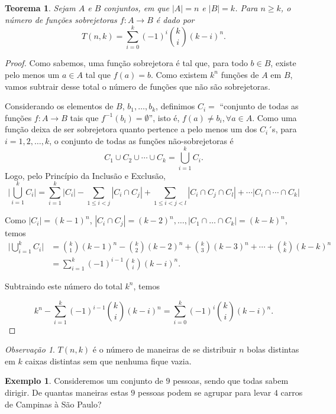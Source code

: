 \documentclass[]{book}
\newtheorem{theorem}{Teorema}[chapter]
\theoremstyle{definition}
\theoremstyle{definition}
\newtheorem{example}{Exemplo}[chapter]
\theoremstyle{definition}
\theoremstyle{remark}
\newtheorem*{remark}{Observação}
\begin{document}
\begin{theorem}
\protect\hypertarget{thm:teoFuncoesSobrejetoras}{}{\label{thm:teoFuncoesSobrejetoras} }Sejam \(A\) e \(B\) conjuntos, em que \(|A|=n\) e \(|B|=k\).
Para \(n\geq k\), o número de funções sobrejetoras \(f:A\rightarrow B\) é dado por
\[T(n,k) = \sum_{i=0}^{k}(-1)^i{k \choose i}(k-i)^n.\]
\end{theorem}

\begin{proof}
\iffalse{} {Prova. } \fi{}Como sabemos, uma função sobrejetora é tal que, para todo \(b \in B\), existe pelo menos um \(a \in A\) tal que \(f(a)=b\).
Como existem \(k^n\) funções de \(A\) em \(B\), vamos subtrair desse total o número de funções que não são sobrejetoras.

Considerando os elementos de \(B\), \(b_1, \ldots, b_k\), definimos \(C_i=\) ``conjunto de todas as funções \(f:A\rightarrow B\) tais que \(f^{-1}(b_i)=\emptyset\)'', isto é,
\(f(a)\neq b_i, \forall a \in A\).
Como uma função deixa de ser sobrejetora quanto pertence a pelo menos um dos \(C_i\)´s, para \(i=1,2,\ldots, k\), o conjunto de todas as funções não-sobrejetoras é
\[C_1 \cup C_2 \cup\cdots \cup C_k = \bigcup_{i=1}^{k}C_i.\]
Logo, pelo Princípio da Inclusão e Exclusão,
\[\Big|\bigcup_{i=1}^{k}C_i\Big| = \sum_{i=1}^{k}|C_i| - \sum_{1\leq i<j}^{}|C_i\cap C_j| + \sum_{1\leq i<j<l}^{}|C_i\cap C_j\cap C_l| + \cdots |C_i\cap\cdots\cap C_k|\]

Como \(|C_i|=(k-1)^n\), \(|C_i\cap C_j| = (k-2)^n, \ldots, |C_1\cap\ldots\cap C_k|=(k-k)^n\), temos
\begin{align}
  \Big|\bigcup_{i=1}^{k}C_i\Big| 
  &={k \choose 1}(k-1)^n - {k \choose 2}(k-2)^n + {k \choose 3}(k-3)^n + \cdots + {k \choose k}(k-k)^n \\
  &=\sum_{i=1}^{k}(-1)^{i-1}{k \choose i}(k-i)^n.
\end{align}

Subtraindo este número do total \(k^n\), temos

\[k^n-\sum_{i=1}^{k}(-1)^{i-1}{k \choose i}(k-i)^n = \sum_{i=0}^{k}(-1)^{i}{k \choose i}(k-i)^n.\]
\end{proof}

\begin{remark}
\iffalse{} {Observação. } \fi{}\(T(n,k)\) é o número de maneiras de se distribuir \(n\) bolas distintas em \(k\) caixas distintas sem que nenhuma fique vazia.
\end{remark}

\begin{example}
\protect\hypertarget{exm:unnamed-chunk-112}{}{\label{exm:unnamed-chunk-112} }Consideremos um conjunto de \(9\) pessoas, sendo que todas sabem dirigir.
De quantas maneiras estas \(9\) pessoas podem se agrupar para levar \(4\) carros de Campinas à São Paulo?
\end{example}
\end{document}

